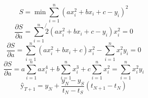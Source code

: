 \documentclass[21pt,a4paper,twoside]{article}
\begin{document}
\Large
\begin{equation}
	 S = \min \sum_{i = 1}^{n} (ax_i^2 + bx_i + c - y_i)^2
\end{equation}
	\newline
	\begin{equation}
		\frac{\partial S}{\partial a} = \sum_{i=1}^{n} \not{2} (ax_i^2 + bx_i + c - y_i) x_i^2 = 0
	\end{equation}
	\newline
	\begin{equation}
		\frac{\partial S}{\partial a} = \sum_{i=1}^{n} (ax_i^2 + bx_i + c) x_i^2 - \sum_{i=1}^{n} x_i^2 y_i = 0
	\end{equation}
	\newline
	\begin{equation}
		\frac{\partial S}{\partial a} = a\sum_{i=1}^{n} ax_i^4 + b\sum_{i=1}^{n} x_i^3 + c\sum_{i=1}^{n} x_i^2 = \sum_{i=1}^{n} x_i^2 y_i
	\end{equation}
	\newline
	\begin{equation}
	\text{ŷ}_{T+1} = y_N + \frac{y_N-y_S}{t_N-t_S} (t_{N+1}-t_N)
	\end{equation}
\end{document}
